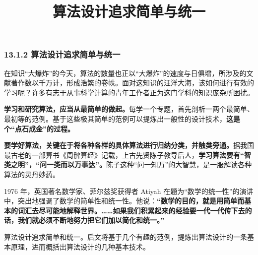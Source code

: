 \documentclass[
  10pt,
  fontset=fandol]{ctexart}
\title{算法设计追求简单与统一}
\author{}
\date{}
\begin{document}
\maketitle

\subsubsection{13.1.2 算法设计追求简单与统一}\label{ux7b97ux6cd5ux8bbeux8ba1ux8ffdux6c42ux7b80ux5355ux4e0eux7edfux4e00}

在知识``大爆炸''的今天，算法的数量也正以``大爆炸''的速度与日俱增，所涉及的文献著作数以千万计，形成浩繁的卷帙。面对这知识的汪洋大海，该如何进行有效的学习呢？许多有志于从事科学计算的青年工作者正为这门学科的知识庞杂所困扰。

\textbf{学习和研究算法，应当从最简单的做起。}每学一个专题，首先剖析一两个最简单、最初等的范例。基于这些极其简单的范例可以提炼出一般性的设计技术，\textbf{这是个``点石成金''的过程。}

\textbf{要学好算法，关键在于将各种各样的具体算法进行归纳分类，并触类旁通。}据我国最古老的一部算书《周髀算经》记载，上古先贤陈子教导后人，\textbf{学习算法要有``智类之明''，``问一类而以万事达''。}陈子这种``问一知万''的大智慧，是一服解读各种算法的灵丹妙药。

1976 年，英国著名数学家、菲尔兹奖获得者 Atiyah 在题为``数学的统一性''的演讲中，突出地强调了数学的简单性和统一性。他说：\textbf{``数学的目的，就是用简单而基本的词汇去尽可能地解释世界。\ldots\ldots 如果我们积累起来的经验要一代一代传下去的话，我们就必须不断地努力把它们加以简化和统一。''}

算法设计追求简单和统一。后文将基于几个有趣的范例，提炼出算法设计的一条基本原理，进而概括出算法设计的几种基本技术。
\end{document}
